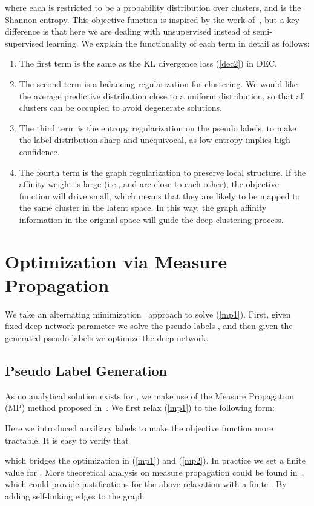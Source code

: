 \documentclass[letterpaper]{article}
\begin{document}
where each  is restricted to be a probability distribution over  clusters, and  is the Shannon entropy. This objective function is inspired by the work of~\cite{mp}, but a key difference is that here we are dealing with unsupervised instead of semi-supervised learning. We explain the functionality of each term in detail as follows:
\begin{enumerate}
     \item The first term is the same as the KL divergence loss (\ref{dec2}) in DEC. 
     \item The second term is a balancing regularization for clustering. We would like the average predictive distribution  close to a uniform distribution, so that all clusters can be occupied to avoid degenerate solutions.
     \item The third term is the entropy regularization on the pseudo labels, to make the label distribution sharp and unequivocal, as low entropy implies high confidence. 
     \item The fourth term is the graph regularization to preserve local structure. If the affinity weight  is large (i.e.,  and  are close to each other), the objective function will drive  small, which means that they are likely to be mapped to the same cluster in the latent space. In this way, the graph affinity information in the original space will guide the deep clustering process.
\end{enumerate}

\section{Optimization via Measure Propagation}\label{omp}
We take an alternating minimization~\cite{csiszar} approach to solve (\ref{mp1}). First, given fixed deep network parameter  we solve the pseudo labels , and then given the generated pseudo labels we optimize the deep network.

\subsection{Pseudo Label Generation}
As no analytical solution exists for , we make use of the Measure Propagation (MP) method proposed in~\cite{mp}. We first relax (\ref{mp1}) to the following form:

Here we introduced auxiliary labels  to make the objective function more tractable. It is easy to verify that 
      
which bridges the optimization in (\ref{mp1}) and (\ref{mp2}). In practice we set a finite value for . More theoretical analysis on measure propagation could be found in~\cite{mp}, which could provide justifications for the above relaxation with a finite . By adding self-linking edges to the graph
\end{document}
